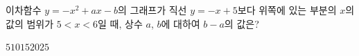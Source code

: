 \hspace*{2mm}\begin{minipage}[t]{\dimexpr\linewidth-2mm\relax}\vspace{0pt}
이차함수 $y=-x^2+ax-b$의 그래프가 직선 $y=-x+5$보다 위쪽에 있는 부분의 $x$의 값의 범위가 $5<x<6$일 때, 상수 $a$, $b$에 대하여 $b-a$의 값은?
\begin{choices32}{$5$}{$10$}{$15$}{$20$}{$25$}\end{choices32}\end{minipage}
